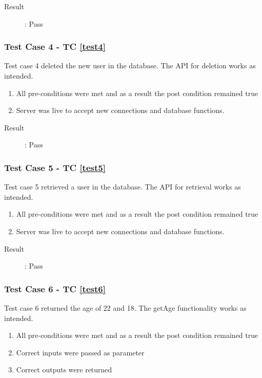 \documentclass{article}
\begin{document}
\begin{description}
	\item [Result]: Pass 
\end{description}

\subsubsection{Test Case 4 - TC \ref{test4}}
Test case 4 deleted the new user in the database.
The API for deletion works as intended.
\begin{enumerate}
	\item All pre-conditions were met and as a result the post condition remained true
	\item Server was live to accept new connections and database functions.
\end{enumerate}

\begin{description}
	\item [Result]: Pass 
\end{description}

\subsubsection{Test Case 5 - TC \ref{test5}}
Test case 5 retrieved a user in the database.
The API for retrieval works as intended.
\begin{enumerate}
	\item All pre-conditions were met and as a result the post condition remained true
	\item Server was live to accept new connections and database functions.
\end{enumerate}

\begin{description}
	\item [Result]: Pass 
\end{description}

\subsubsection{Test Case 6 - TC \ref{test6}}
Test case 6 returned the age of 22 and 18. 
The getAge functionality works as intended.
\begin{enumerate}
	\item All pre-conditions were met and as a result the post condition remained true
	\item Correct inputs were passed as parameter 
	\item Correct outputs were returned
\end{enumerate}
\end{document}
